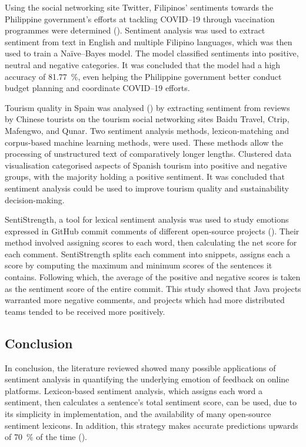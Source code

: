 \documentclass[
	fontsize=12pt,
	paper=a4,
	bibliography=totocnumbered
]{scrartcl}
\begin{document}
Using the social networking site Twitter,
Filipinos' sentiments towards the Philippine government's efforts
at tackling COVID--19 through vaccination programmes were determined (\cite{twitter}).
Sentiment analysis was used to extract sentiment from text in English and multiple Filipino languages,
which was then used to train a Na{\"i}ve--Bayes model. The model classified
sentiments into positive, neutral and negative categories. It was concluded that
the model had a high accuracy of \qty{81.77}{\percent}, even helping the
Philippine government better conduct budget planning and coordinate COVID--19 efforts.

Tourism quality in Spain was analysed (\cite{spain}) by
extracting sentiment from reviews by Chinese tourists on the tourism
social networking sites Baidu Travel, Ctrip, Mafengwo, and Qunar.
Two sentiment analysis methods, lexicon-matching and corpus-based machine
learning methods, were used. These methods allow the processing of
unstructured text of comparatively longer lengths. Clustered data
visualisation categorised aspects of Spanish tourism into positive
and negative groups, with the majority holding a positive sentiment.
It was concluded that sentiment analysis could be used to improve tourism
quality and sustainability decision-making.

SentiStrength, a tool for lexical sentiment analysis was used to study emotions expressed in GitHub
commit comments of different open-source projects (\cite{github}).
Their method involved assigning scores to each word, then calculating the net
score for each comment. SentiStrength splits each comment into snippets, assigns
each a score by computing the maximum and minimum scores of the sentences it contains.
Following which, the average of the positive and negative scores is taken as the
sentiment score of the entire commit. This study showed that Java projects warranted
more negative comments, and projects which had more distributed teams tended
to be received more positively.

\subsection{Conclusion}

In conclusion, the literature reviewed showed many possible applications
of sentiment analysis in quantifying the underlying emotion of feedback
on online platforms. Lexicon-based sentiment analysis, which assigns each
word a sentiment, then calculates a sentence's total sentiment score, can
be used, due to its simplicity in implementation, and the availability of
many open-source sentiment lexicons. In addition, this strategy makes accurate predictions upwards of
\qty{70}{\percent} of the time (\cite{khoo}).
\end{document}
